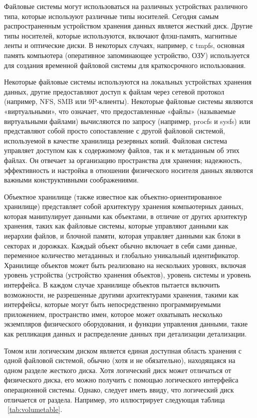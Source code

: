 \par
Файловые системы могут использоваться на различных устройствах различного типа, которые используют различные типы носителей. Сегодня самым распространенным устройством хранения данных является жесткий диск. Другие типы носителей, которые используются, включают флэш-память, магнитные ленты и оптические диски. В некоторых случаях, например, с tmpfs, основная память компьютера (оперативное запоминающее устройство, ОЗУ) используется для создания временной файловой системы для краткосрочного использования.
\par 
Некоторые файловые системы используются на локальных устройствах хранения данных, другие предоставляют доступ к файлам через сетевой протокол (например, NFS, SMB или 9P-клиенты). Некоторые файловые системы являются «виртуальными», что означает, что предоставленные «файлы» (называемые виртуальными файлами) вычисляются по запросу (например, procfs и sysfs) или представляют собой просто сопоставление с другой файловой системой, используемой в качестве хранилища резервных копий. Файловая система управляет доступом как к содержимому файлов, так и к метаданным об этих файлах. Он отвечает за организацию пространства для хранения; надежность, эффективность и настройка в отношении физического носителя данных являются важными конструктивными соображениями.

\par 

Объектное хранилище (также известное как объектно-ориентированное хранилище) представляет собой архитектуру хранения компьютерных данных, которая манипулирует данными как объектами, в отличие от других архитектур хранения, таких как файловые системы, которые управляют данными как иерархии файлов, и блочной памяти, которая управляет данными как блоки в секторах и дорожках. Каждый объект обычно включает в себя сами данные, переменное количество метаданных и глобально уникальный идентификатор. Хранилище объектов может быть реализовано на нескольких уровнях, включая уровень устройства (устройство хранения объектов), уровень системы и уровень интерфейса. В каждом случае хранилище объектов пытается включить возможности, не разрешенные другими архитектурами хранения, такими как интерфейсы, которые могут быть непосредственно программируемыми приложением, пространство имен, которое может охватывать несколько экземпляров физического оборудования, и функции управления данными, такие как репликация данных и распределение данных при детализации детализации.

\par 
Томом или логическим диском является единая доступная область хранения с одной файловой системой, обычно (хотя и не обязательно), находящаяся на одном разделе жесткого диска. Хотя логический диск может отличаться от физического диска, его можно получить с помощью логического интерфейса операционной системы. Однако, следует иметь ввиду, что логический диск отличается от раздела. Например, это иллюстрирует следующая таблица ~\ref{tab:volumetable}.


